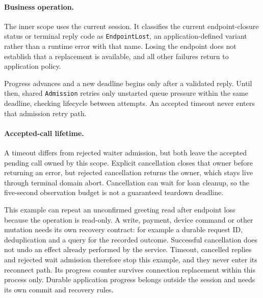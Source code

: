 

\paragraph*{Business operation.}
The inner scope uses the current session. It classifies the current
endpoint-closure status or terminal reply code as \texttt{EndpointLost}, an
application-defined variant rather than a runtime error with that name. Losing
the endpoint does not establish that a replacement is available, and all other
failures return to application policy.

Progress advances and a new deadline begins only after a validated reply. Until
then, shared \texttt{Admission} retries only unstarted queue pressure within the
same deadline, checking lifecycle between attempts. An accepted timeout never
enters that admission retry path.



\begin{samepage}
\paragraph*{Accepted-call lifetime.}
A timeout differs from rejected waiter admission, but both leave the accepted
pending call owned by this scope. Explicit cancellation closes that owner before
returning an error, but rejected cancellation returns the owner, which stays live
through terminal domain abort. Cancellation can wait for loan cleanup, so the
five-second observation budget is not a guaranteed teardown deadline.\par
\end{samepage}



This example can repeat an unconfirmed greeting read after endpoint loss because
the operation is read-only. A write, payment, device command or other mutation
needs its own recovery contract: for example a durable request ID, deduplication
and a query for the recorded outcome. Successful cancellation does not undo an
effect already performed by the service. Timeout, cancelled replies and rejected
wait admission therefore stop this example, and they never enter its reconnect path.
Its progress counter survives connection replacement within this process only.
Durable application progress belongs outside the session and needs its own commit
and recovery rules.

